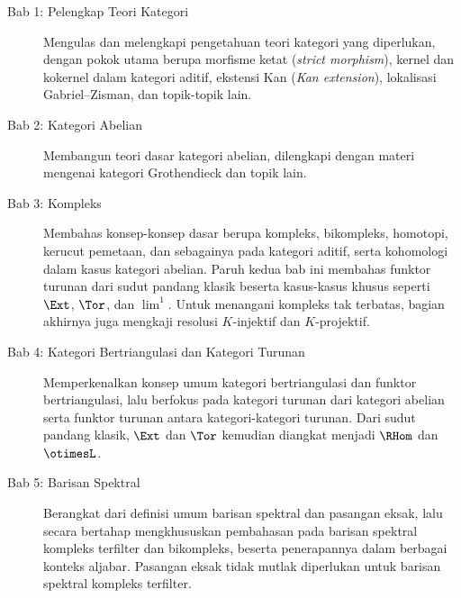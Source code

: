 \begin{description}
	\item[Bab 1: Pelengkap Teori Kategori] Mengulas dan melengkapi pengetahuan
	teori kategori yang diperlukan, dengan pokok utama berupa morfisme ketat
	(\emph{strict morphism}), kernel dan kokernel dalam kategori aditif,
	ekstensi Kan (\emph{Kan extension}), lokalisasi Gabriel--Zisman, dan topik-topik lain.
	\item[Bab 2: Kategori Abelian] Membangun teori dasar kategori abelian,
	dilengkapi dengan materi mengenai kategori Grothendieck dan topik lain.
	\item[Bab 3: Kompleks] Membahas konsep-konsep dasar berupa kompleks,
	bikompleks, homotopi, kerucut pemetaan, dan sebagainya pada kategori
	aditif, serta kohomologi dalam kasus kategori abelian. Paruh kedua bab ini
	membahas funktor turunan dari sudut pandang klasik beserta kasus-kasus
	khusus seperti $\Ext$, $\Tor$, dan $\lim^1$. Untuk menangani kompleks tak
	terbatas, bagian akhirnya juga mengkaji resolusi $K$-injektif dan
	$K$-projektif.
	\item[Bab 4: Kategori Bertriangulasi dan Kategori Turunan] Memperkenalkan
	konsep umum kategori bertriangulasi dan funktor bertriangulasi, lalu
	berfokus pada kategori turunan dari kategori abelian serta funktor
	turunan antara kategori-kategori turunan. Dari sudut pandang klasik,
	$\Ext$ dan $\Tor$ kemudian diangkat menjadi $\RHom$ dan $\otimesL$.
	\item[Bab 5: Barisan Spektral] Berangkat dari definisi umum barisan
	spektral dan pasangan eksak, lalu secara bertahap mengkhususkan
	pembahasan pada barisan spektral kompleks terfilter dan bikompleks,
	beserta penerapannya dalam berbagai konteks aljabar. Pasangan eksak tidak mutlak
	diperlukan untuk barisan spektral kompleks terfilter.
\end{description}


